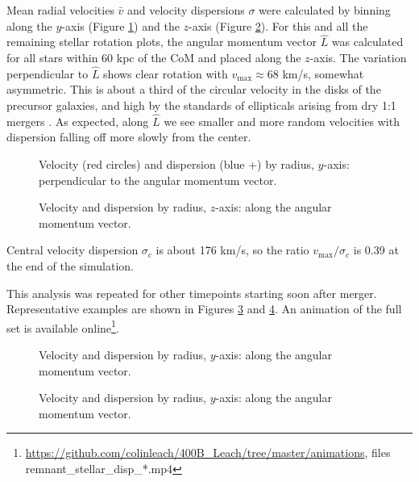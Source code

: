 \documentclass[twocolumn]{aastex63}
\begin{document}
Mean radial velocities $\bar{v}$ and velocity dispersions $\sigma$ were calculated by binning along the $y$-axis (Figure \ref{fig:rem_disp_y_801}) and the $z$-axis (Figure \ref{fig:rem_disp_z_801}). For this and all the remaining stellar rotation plots, the angular momentum vector $\hat{L}$ was calculated for all stars within 60 kpc of the CoM and placed along the $z$-axis. The variation perpendicular to $\hat{L}$ shows clear rotation with $v_{\text{max}} \approx 68$ km/s, somewhat asymmetric. This is about a third of the circular velocity in the disks of the precursor galaxies, and high by the standards of ellipticals arising from dry 1:1 mergers \citep{naab_statistical_2003}. As expected, along $\hat{L}$ we see smaller and more random velocities with dispersion falling off more slowly from the center.

\begin{figure}[htb!]
	\caption{Velocity (red circles) and dispersion (blue +) by radius, $y$-axis: perpendicular to the angular momentum vector.
		\label{fig:rem_disp_y_801}}
\end{figure}

\begin{figure}[htb!]
	\caption{Velocity and dispersion by radius, $z$-axis: along the angular momentum vector.
		\label{fig:rem_disp_z_801}}
\end{figure}

Central velocity dispersion $\sigma_c$ is about 176 km/s, so the ratio $v_{\text{max}} / \sigma_c$ is 0.39 at the end of the simulation.

This analysis was repeated for other timepoints starting soon after merger. Representative examples are shown in Figures \ref{fig:rem_disp_y_450} and \ref{fig:rem_disp_y_600}. An animation of the full set is available online\footnote{\url{https://github.com/colinleach/400B_Leach/tree/master/animations}, files remnant\_stellar\_disp\_*.mp4 }.

\begin{figure}[htb!]
	\caption{Velocity and dispersion by radius, $y$-axis: along the angular momentum vector.
		\label{fig:rem_disp_y_450}}
\end{figure}

\begin{figure}[htb!]
	\caption{Velocity and dispersion by radius, $y$-axis: along the angular momentum vector.
		\label{fig:rem_disp_y_600}}
\end{figure}
\end{document}
